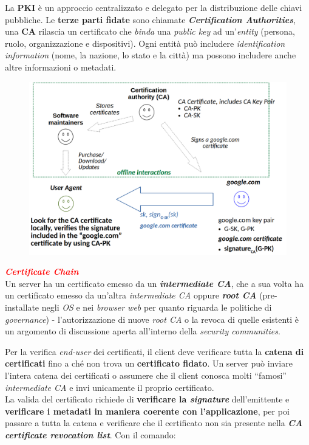 \begin{flushleft}

    La \textbf{PKI} è un approccio centralizzato e delegato per la distribuzione delle chiavi pubbliche. Le \textbf{terze parti fidate} sono chiamate \textbf{\textit{Certification Authorities}}, una \textbf{CA} rilascia un certificato che \textit{binda} una \textit{public key} ad un'\textit{entity} (persona, ruolo, organizzazione e dispositivi). Ogni entità può includere \textit{identification information} (nome, la nazione, lo stato e la città) ma possono includere anche altre informazioni o metadati.

    \smallskip

    \begin{figure}[h]
        \centering
        \includegraphics[width=\textwidth]{img/ca_mf.png}
    \end{figure}

    \newpage

    \textcolor{red}{\textbf{\textit{Certificate Chain}}} \\
    Un server ha un certificato emesso da un \textbf{\textit{intermediate CA}}, che a sua volta ha un certificato emesso da un'altra \textit{intermediate CA} oppure \textbf{\textit{root CA}} (pre-installate negli \textit{OS} e nei \textit{browser web} per quanto riguarda le politiche di \textit{governance}) - l'autorizzazione di nuove \textit{root CA} o la revoca di quelle esistenti è un argomento di discussione aperta all'interno della \textit{security communities}.

    \smallskip

    Per la verifica \textit{end-user} dei certificati, il client deve verificare tutta la \textbf{catena di certificati} fino a ché non trova un \textbf{certificato fidato}. Un server può inviare l'intera catena dei certificati o assumere che il client conosca molti ``famosi'' \textit{intermediate CA} e invi unicamente il proprio certificato. \\
    La valida del certificato richiede di \textbf{verificare la \textit{signature}} dell'emittente e \textbf{verificare i metadati in maniera coerente con l'applicazione}, per poi passare a tutta la catena e verificare che il certificato non sia presente nella \textbf{\textit{CA certificate revocation list}}. Con il comando:
    

\end{flushleft}
